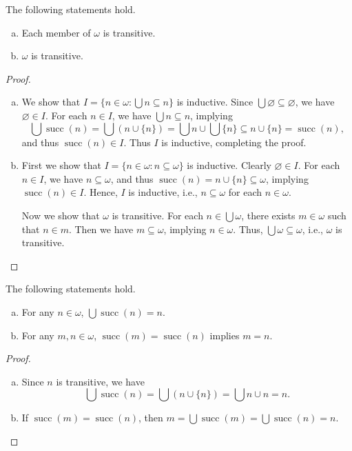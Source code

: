 \documentclass[11pt]{article}
\DeclareMathOperator{\suc}{succ}
\begin{document}
\begin{theorem}
  The following statements hold.
  \begin{enumerate}[(a)]
    \item Each member of $\omega$ is transitive.
    \item $\omega$ is transitive.
  \end{enumerate}
\end{theorem}
\begin{proof}
  \leavevmode
  \begin{enumerate}[(a)]
    \item We show that $I = \{n \in \omega: \bigcup n \subseteq n\}$ is inductive.
    Since $\bigcup \varnothing \subseteq \varnothing$, we have $\varnothing \in I$.
    For each $n \in I$, we have $\bigcup n \subseteq n$, implying
    \begin{equation*}
      \bigcup \suc(n) = \bigcup (n \cup \{n\}) = \bigcup n \cup \bigcup \{n\} \subseteq n \cup \{n\} = \suc(n),
    \end{equation*}
    and thus $\suc(n) \in I$.
    Thus $I$ is inductive, completing the proof.
    \item First we show that $I = \{n \in \omega: n \subseteq \omega\}$ is inductive.
    Clearly $\varnothing \in I$.
    For each $n \in I$, we have $n \subseteq \omega$, and thus $\suc(n) = n \cup \{n\} \subseteq \omega$, implying $\suc(n) \in I$.
    Hence, $I$ is inductive, i.e., $n \subseteq \omega$ for each $n \in \omega$.
    \par Now we show that $\omega$ is transitive.
    For each $n \in \bigcup \omega$, there exists $m \in \omega$ such that $n \in m$.
    Then we have $m \subseteq \omega$, implying $n \in \omega$.
    Thus, $\bigcup \omega \subseteq \omega$, i.e., $\omega$ is transitive.
    \qedhere
  \end{enumerate}
\end{proof}

\begin{theorem}
  \label{thm:predecessor}
  The following statements hold.
  \begin{enumerate}[(a)]
    \item For any $n \in \omega$, $\bigcup \suc(n) = n$.
    \item For any $m, n \in \omega$, $\suc(m) = \suc(n)$ implies $m = n$.
  \end{enumerate}
\end{theorem}
\begin{proof}
  \leavevmode
  \begin{enumerate}[(a)]
    \item Since $n$ is transitive, we have
    \begin{equation*}
      \bigcup \suc(n) = \bigcup (n \cup \{n\}) = \bigcup n \cup n = n.
    \end{equation*}
    \item If $\suc(m) = \suc(n)$, then $m = \bigcup \suc(m) = \bigcup \suc(n) = n$.
    \qedhere
  \end{enumerate}
\end{proof}
\end{document}
